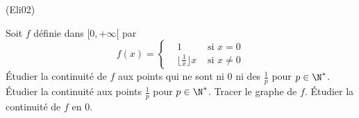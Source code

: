 \begin{tiny}(Eli02)\end{tiny} Soit $f$ d{\'e}finie dans $[0,+\infty[$ par 
\begin{displaymath}
 f(x)=
\left\lbrace 
\begin{aligned}
 &1 &\text{ si } x=0\\
 &\lfloor  \frac{1}{x} \rfloor x &\text{ si } x\neq 0
\end{aligned}
\right. 
\end{displaymath}
\'Etudier la continuit{\'e} de $f$ aux points qui ne sont ni $0$ ni des $\frac{1}{p}$ pour $p\in \N^{*}$. \'Etudier la continuit{\'e} aux points $\frac{1}{p}$ pour $p\in \N^{*}$. Tracer le graphe de $f$. \'Etudier la continuité de $f$ en $0$.